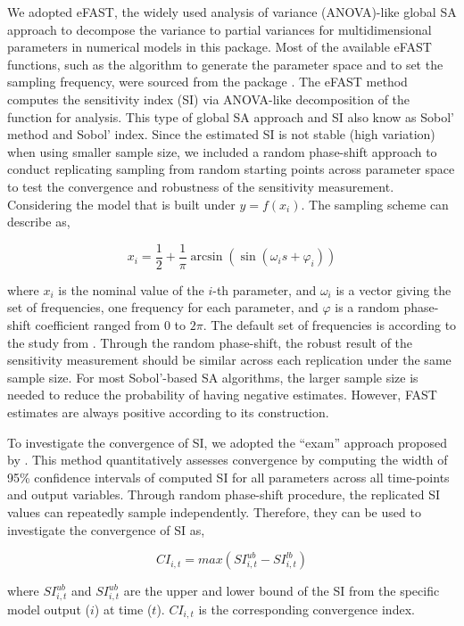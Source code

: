 We adopted eFAST, the widely used analysis of variance (ANOVA)-like
global SA approach to decompose the variance to partial variances for
multidimensional parameters in numerical models in this package. Most of
the available eFAST functions, such as the algorithm to generate the
parameter space and to set the sampling frequency, were sourced from the
 package \citep{R-sensitivity}. The eFAST method
computes the sensitivity index (SI) via ANOVA-like decomposition of the
function for analysis. This type of global SA approach and SI also know
as Sobol' method and Sobol' index. Since the estimated SI is not stable
(high variation) when using smaller sample size, we included a random
phase-shift approach to conduct replicating sampling from random
starting points across parameter space to test the convergence and
robustness of the sensitivity measurement. Considering the model that is
built under \(y=f(x_{i})\). The sampling scheme can describe as,

\[ x_i = \frac{1}{2} + \frac{1}{\pi}\arcsin(\sin(\omega_is + \varphi_i)) \]

where \(x_i\) is the nominal value of the \(i\)-th parameter, and
\(\omega_i\) is a vector giving the set of frequencies, one frequency
for each parameter, and \(\varphi\) is a random phase-shift coefficient
ranged from 0 to \(2\pi\). The default set of frequencies is according
to the study from \citet{saltelli1999quantitative}. Through the random
phase-shift, the robust result of the sensitivity measurement should be
similar across each replication under the same sample size. For most
Sobol'-based SA algorithms, the larger sample size is needed to reduce
the probability of having negative estimates. However, FAST estimates
are always positive according to its construction.

To investigate the convergence of SI, we adopted the ``exam'' approach
proposed by \citep{sarrazin2016global}. This method quantitatively
assesses convergence by computing the width of 95\% confidence intervals
of computed SI for all parameters across all time-points and output
variables. Through random phase-shift procedure, the replicated SI
values can repeatedly sample independently. Therefore, they can be used
to investigate the convergence of SI as,

\[CI_{i,t} = max(SI_{i,t}^{ub}-SI_{i,t}^{lb})\]

where \(SI_{i,t}^{ub}\) and \(SI_{i,t}^{ub}\) are the upper and lower
bound of the SI from the specific model output (\(i\)) at time (\(t\)).
\(CI_{i,t}\) is the corresponding convergence index.

